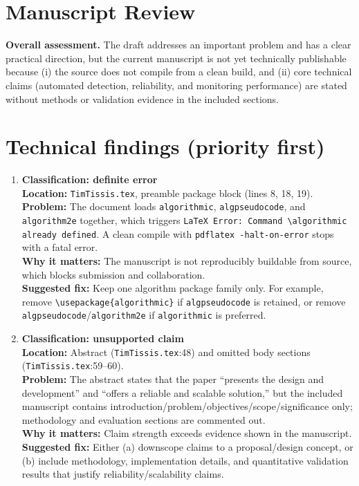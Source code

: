 \documentclass[11pt]{article}
\begin{document}
\section*{Manuscript Review}
\textbf{Overall assessment.} The draft addresses an important problem and has a clear practical direction, but the current manuscript is not yet technically publishable because (i) the source does not compile from a clean build, and (ii) core technical claims (automated detection, reliability, and monitoring performance) are stated without methods or validation evidence in the included sections.

\section*{Technical findings (priority first)}
\begin{enumerate}[leftmargin=*,label=\textbf{T\arabic*.}]
  \item \textbf{Classification: definite error}\\
  \textbf{Location:} \texttt{TimTissis.tex}, preamble package block (lines 8, 18, 19).\\
  \textbf{Problem:} The document loads \texttt{algorithmic}, \texttt{algpseudocode}, and \texttt{algorithm2e} together, which triggers \texttt{LaTeX Error: Command \textbackslash algorithmic already defined}. A clean compile with \texttt{pdflatex -halt-on-error} stops with a fatal error.\\
  \textbf{Why it matters:} The manuscript is not reproducibly buildable from source, which blocks submission and collaboration.\\
  \textbf{Suggested fix:} Keep one algorithm package family only. For example, remove \texttt{\textbackslash usepackage\{algorithmic\}} if \texttt{algpseudocode} is retained, or remove \texttt{algpseudocode}/\texttt{algorithm2e} if \texttt{algorithmic} is preferred.

  \item \textbf{Classification: unsupported claim}\\
  \textbf{Location:} Abstract (\texttt{TimTissis.tex}:48) and omitted body sections (\texttt{TimTissis.tex}:59--60).\\
  \textbf{Problem:} The abstract states that the paper ``presents the design and development'' and ``offers a reliable and scalable solution,'' but the included manuscript contains introduction/problem/objectives/scope/significance only; methodology and evaluation sections are commented out.\\
  \textbf{Why it matters:} Claim strength exceeds evidence shown in the manuscript.\\
  \textbf{Suggested fix:} Either (a) downscope claims to a proposal/design concept, or (b) include methodology, implementation details, and quantitative validation results that justify reliability/scalability claims.


\end{enumerate}
\end{document}
